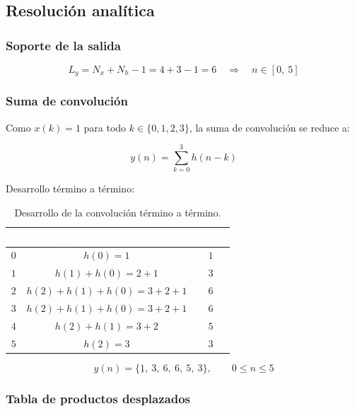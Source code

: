 \documentclass[../Main_Include.tex]{subfiles}
\begin{document}
\subsection*{Resolución analítica}

\subsubsection*{Soporte de la salida}

\[
    L_y = N_x + N_h - 1 = 4 + 3 - 1 = 6
    \quad\Rightarrow\quad n \in [0,\ 5]
\]

\subsubsection*{Suma de convolución}

Como $x(k) = 1$ para todo $k \in \{0,1,2,3\}$, la suma de convolución
se reduce a:

\[
    y(n) = \sum_{k=0}^{3} h(n-k)
\]

Desarrollo término a término:

\begin{table}[H]
\centering
\renewcommand{\arraystretch}{1.4}
\begin{tabular}{ccc}
\toprule
\rowcolor{azulprinc}
\textcolor{white}{\textbf{$n$}} &
\textcolor{white}{\textbf{Productos $x(k)\,h(n-k)$}} &
\textcolor{white}{\textbf{$y(n)$}} \\
\midrule
\rowcolor{grisclaro}
$0$ & $h(0) = 1$ & $1$ \\
$1$ & $h(1)+h(0) = 2+1$ & $3$ \\
\rowcolor{grisclaro}
$2$ & $h(2)+h(1)+h(0) = 3+2+1$ & $6$ \\
$3$ & $h(2)+h(1)+h(0) = 3+2+1$ & $6$ \\
\rowcolor{grisclaro}
$4$ & $h(2)+h(1) = 3+2$ & $5$ \\
$5$ & $h(2) = 3$ & $3$ \\
\bottomrule
\end{tabular}
\caption{Desarrollo de la convolución término a término.}
\end{table}

\[
    \boxed{y(n) = \{\underline{1},\ 3,\ 6,\ 6,\ 5,\ 3\},
    \qquad 0 \le n \le 5}
\]

\subsubsection*{Tabla de productos desplazados}
\end{document}
